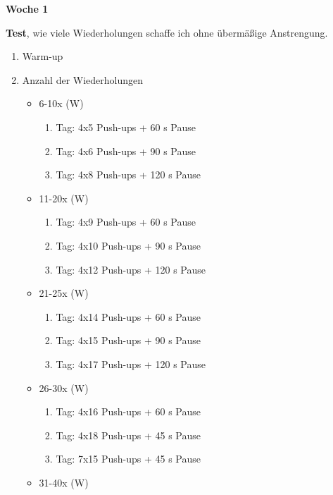 \newpage

\textbf{Woche 1}

\textbf{Test}, wie viele Wiederholungen schaffe ich ohne übermäßige
Anstrengung.

\begin{enumerate}
\item
  Warm-up
\item
  Anzahl der Wiederholungen

  \begin{itemize}
  \item
    6-10x (W)

    \begin{enumerate}
    \def\labelenumii{\arabic{enumii}.}
    \item
      Tag: 4x5 Push-ups + 60 s Pause
    \item
      Tag: 4x6 Push-ups + 90 s Pause
    \item
      Tag: 4x8 Push-ups + 120 s Pause
    \end{enumerate}
  \item
    11-20x (W)

    \begin{enumerate}
    \def\labelenumii{\arabic{enumii}.}
    \item
      Tag: 4x9 Push-ups + 60 s Pause
    \item
      Tag: 4x10 Push-ups + 90 s Pause
    \item
      Tag: 4x12 Push-ups + 120 s Pause
    \end{enumerate}
  \item
    21-25x (W)

    \begin{enumerate}
    \def\labelenumii{\arabic{enumii}.}
    \item
      Tag: 4x14 Push-ups + 60 s Pause
    \item
      Tag: 4x15 Push-ups + 90 s Pause
    \item
      Tag: 4x17 Push-ups + 120 s Pause
    \end{enumerate}
  \item
    26-30x (W)

    \begin{enumerate}
    \def\labelenumii{\arabic{enumii}.}
    \item
      Tag: 4x16 Push-ups + 60 s Pause
    \item
      Tag: 4x18 Push-ups + 45 s Pause
    \item
      Tag: 7x15 Push-ups + 45 s Pause
    \end{enumerate}
  \item
    31-40x (W)


\end{itemize}
\end{enumerate}

